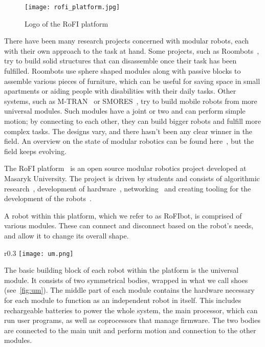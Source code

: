 \begin{figure}
    \centering
    \texttt{[image: rofi\_platform.jpg]}
  \caption{Logo of the RoFI platform~\cite{rofiPlatform}}
\end{figure}

There have been many research projects concerned with modular robots, each with their own approach to the task at hand. Some projects, such as Roombots~\cite{sprowitz_roombots_2010}, try to build solid structures that can disassemble once their task has been fulfilled. Roombots use sphere shaped modules along with passive blocks to assemble various pieces of furniture, which can be useful for saving space in small apartments or aiding people with disabilities with their daily tasks. Other systems, such as M-TRAN~\cite{mtran} or SMORES~\cite{smores}, try to build mobile robots from more universal modules. Such modules have a joint or two and can perform simple motion; by connecting to each other, they can build bigger robots and fulfill more complex tasks. The designs vary, and there hasn't been any clear winner in the field. An overview on the state of modular robotics can be found here~\cite{modular_survey}, but the field keeps evolving.

The RoFI platform~\cite{Mrázek2019thesis} is an open source modular robotics project developed at Masaryk University. The project is driven by students and consists of algorithmic research~\cite{Vozárová2019thesis, Zacek2021thesis, Nausova2022thesis, Ondika2021thesis, SMTReconfig}, development of hardware~\cite{Mrázek2019thesis, RoFICoM}, networking~\cite{Chlup2020thesis, Chlup2023thesis} and creating tooling for the development of the robots~\cite{Naušová2019thesis, Svoboda2020thesis}.

A robot within this platform, which we refer to as RoFIbot, is comprised of various modules. These can connect and disconnect based on the robot's needs, and allow it to change its overall shape.

\begin{wrapfigure}{r}{0.3\textwidth}
    \centering
    \texttt{[image: um.png]}
  \caption{Build of the universal module~\cite{rofiUm}}\label{fig:um}
\end{wrapfigure}

The basic building block of each robot within the platform is the universal module. It consists of two symmetrical bodies, wrapped in what we call shoes (see~\ref{fig:um}). The middle part of each module contains the hardware necessary for each module to function as an independent robot in itself. This includes rechargeable batteries to power the whole system, the main processor, which can run user programs, as well as coprocessors that manage firmware. The two bodies are connected to the main unit and perform motion and connection to the other modules.


